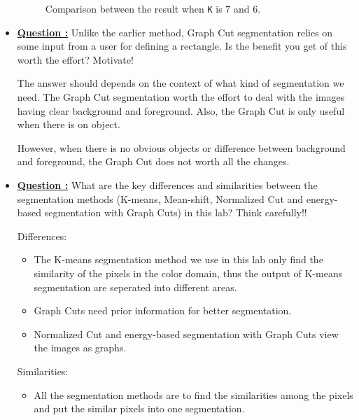 \documentclass[11pt,a4paper]{article}
\begin{document}
\begin{itemize}
\begin{figure}[!ht]
			\caption{Comparison between the result when \texttt{K} is $7$ and $6$.}
			\label{fig:Graphcuts_Tiger3_Alpha_10_Sigma_16_K_7_6}
		\end{figure}
	
	\item\addtocounter{Counter}{1}\underline{\textbf{Question :}} Unlike the earlier method, Graph Cut segmentation relies on some input from a user for defining a rectangle. Is the benefit you get of this worth the effort? Motivate!
		\par The answer should depends on the context of what kind of segmentation we need. The Graph Cut segmentation worth the effort to deal with the images having clear background and foreground. Also, the Graph Cut is only useful when there is on object.
		\par However, when there is no obvious objects or difference between background and foreground, the Graph Cut does not worth all the changes.
	
	\item\addtocounter{Counter}{1}\underline{\textbf{Question :}} What are the key differences and similarities between the segmentation methods (K-means, Mean-shift, Normalized Cut and energy-based segmentation with Graph Cuts) in this lab? Think carefully!!
		\par Differences:
		\begin{itemize}
			\item The K-means segmentation method we use in this lab only find the similarity of the pixels in the color domain, thus the output of K-means segmentation are seperated into different areas.
			\item Graph Cuts need prior information for better segmentation.
			\item Normalized Cut and energy-based segmentation with Graph Cuts view the images as graphs.
		\end{itemize}
		
		\par Similarities:
		\begin{itemize}
			\item All the segmentation methods are to find the similarities among the pixels and put the similar pixels into one segmentation.
		\end{itemize}
\end{itemize}
\end{document}

